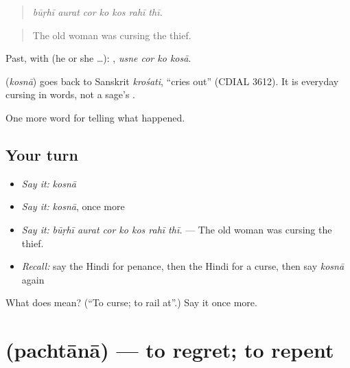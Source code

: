 \begin{quote}
      
\end{quote}

\begin{quote}
\emph{būṛhī aurat cor ko kos rahī thī.}
\end{quote}

\begin{quote}
The old woman was cursing the thief.
\end{quote}

Past, with  (he or she …):    , \emph{usne cor ko kosā}.

\begin{cousinweb}
\textbf{} (\emph{kosnā}) goes back to Sanskrit \emph{krośati}, \textquotedblleft{}cries out\textquotedblright{} (CDIAL 3612). It is everyday cursing in words, not a sage's \textbf{}.
\end{cousinweb}

\begin{grammarlens}[title={What you've built}]
One more word for telling what happened.
\end{grammarlens}

\subsection*{Your turn}
\begin{itemize}
\raggedright
  \item \emph{Say it:} \emph{kosnā}
  \item \emph{Say it:} \emph{kosnā}, once more
  \item \emph{Say it:} \emph{būṛhī aurat cor ko kos rahī thī.} — The old woman was cursing the thief.
  \item \emph{Recall:} say the Hindi for penance, then the Hindi for a curse, then say \emph{kosnā} again
\end{itemize}

\begin{tcolorbox}[breakable,colback=teal!4,colframe=teal!35!black,title={Before you move on}]
What does  mean? (\textquotedblleft{}To curse; to rail at\textquotedblright{}.) Say it once more.
\end{tcolorbox}
\section[\texorpdfstring{\hi{पछताना} (pachtānā)}{पछताना (pachtānā)}]{ (pachtānā) — to regret; to repent}

